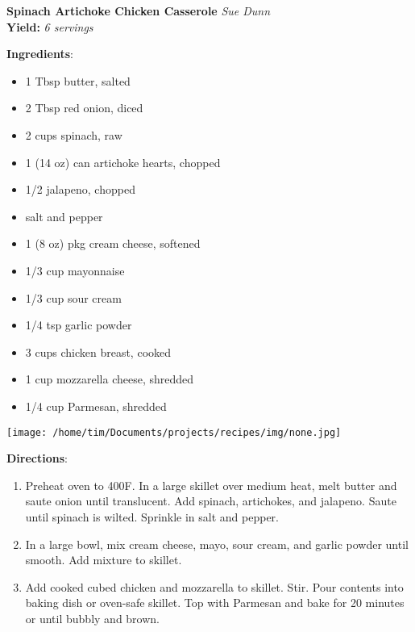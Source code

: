 \documentclass[11pt, twoside, openany]{book}
\begin{document}
\noindent\begin{minipage}[t]{\linewidth}%
{\Large\textbf{Spinach Artichoke Chicken Casserole}} \label{spinach-artichoke-chicken-casserole}\hfill\textit{Sue Dunn}\\
\textbf{Yield:} \textit{6 servings}\\
\noindent\begin{minipage}[t]{0.78\linewidth}%
\textbf{Ingredients}:\vspace{-3mm}
\begin{multicols}{2}
\begin{itemize}\setlength\itemsep{-1mm}
\item 1 Tbsp butter, salted
\item 2 Tbsp red onion, diced
\item 2 cups spinach, raw
\item 1 (14 oz) can artichoke hearts, chopped
\item 1/2 jalapeno, chopped
\item salt and pepper
\item 1 (8 oz) pkg cream cheese, softened
\item 1/3 cup mayonnaise
\item 1/3 cup sour cream
\item 1/4 tsp garlic powder
\item 3 cups chicken breast, cooked
\item 1 cup mozzarella cheese, shredded
\item 1/4 cup Parmesan, shredded
\end{itemize}
\end{multicols}
\end{minipage}
\noindent\begin{minipage}[t]{0.18\linewidth}
\centering \strut\vspace*{-\baselineskip}\newline
\texttt{[image: /home/tim/Documents/projects/recipes/img/none.jpg]}\\
\end{minipage}\vspace{3mm}
\textbf{Directions}:
\vspace{-3mm}\begin{enumerate}\setlength\itemsep{-1mm}
\item Preheat oven to 400F. In a large skillet over medium heat, melt butter and saute onion until translucent. Add spinach, artichokes, and jalapeno. Saute until spinach is wilted. Sprinkle in salt and pepper.
\item In a large bowl, mix cream cheese, mayo, sour cream, and garlic powder until smooth. Add mixture to skillet.
\item Add cooked cubed chicken and mozzarella to skillet. Stir. Pour contents into baking dish or oven-safe skillet. Top with Parmesan and bake for 20 minutes or until bubbly and brown.
\end{enumerate}
\end{minipage}\vspace{8mm}
\end{document}
